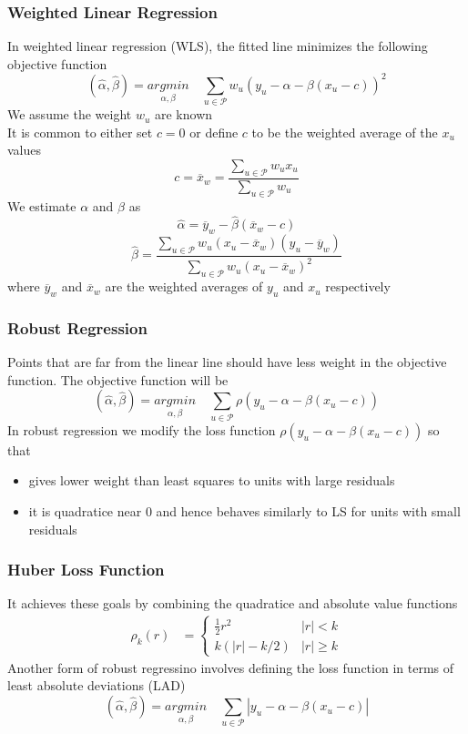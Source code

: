 \documentclass[11pt]{article}
\begin{document}
\subsubsection*{Weighted Linear Regression}
In weighted linear regression (WLS), the fitted line minimizes the following objective function 
\[(\hat{\alpha},\hat{\beta}) = \underset{\alpha,\beta}{argmin} \quad \sum_{u\in\mathcal{P}}w_u(y_u-\alpha-\beta (x_u - c))^2\]
We assume the weight $w_u$ are known \\
It is common to either set $c=0$ or define $c$ to be the weighted average of the $x_u$ values 
\[c=\overline{x}_w = \frac{\sum_{u\in\mathcal{P}}w_u x_u}{\sum_{u\in\mathcal{P}}w_u}\]
We estimate $\alpha$ and $\beta$ as 
\[\hat{\alpha} = \overline{y}_w - \hat{\beta}(\overline{x}_w - c)\]
\[\hat{\beta} = \frac{\sum_{u\in\mathcal{P}}w_u (x_u - \overline{x}_w)(y_u - \overline{y}_w)}{\sum_{u\in\mathcal{P}}w_u (x_u - \overline{x}_w)^2}\]
where $\overline{y}_w$ and $\overline{x}_w$ are the weighted averages of $y_u$ and $x_u$ respectively
\subsubsection*{Robust Regression}
Points that are far from the linear line should have less weight in the objective function. The objective function will be 
\[(\hat{\alpha},\hat{\beta}) = \underset{\alpha,\beta}{argmin} \quad \sum_{u\in\mathcal{P}}\rho(y_u-\alpha-\beta (x_u - c))\]
In robust regression we modify the loss function $\rho(y_u-\alpha-\beta (x_u - c))$ so that 
\begin{itemize}
    \item gives lower weight than least squares to units with large residuals 
    \item it is quadratice near $0$ and hence behaves similarly to LS for units with small residuals 
\end{itemize}
\subsubsection*{Huber Loss Function}
It achieves these goals by combining the quadratice and absolute value functions 
\begin{align*}
    \rho_k(r) &= 
    \begin{cases}
        \frac{1}{2}r^2 & |r|<k \\
        k(|r|-k/2) & |r|\geq k
    \end{cases}
\end{align*}
Another form of robust regressino involves defining the loss function in terms of least absolute deviations (LAD)
\[(\hat{\alpha},\hat{\beta}) = \underset{\alpha,\beta}{argmin} \quad \sum_{u\in\mathcal{P}}|y_u-\alpha-\beta (x_u - c)|\]
\end{document}
